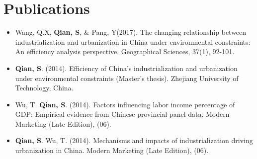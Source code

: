 \documentclass[letterpaper,11pt]{article}
\begin{document}
\section{Publications}
\begin{itemize}[leftmargin=*]
\item {Wang, Q.X, \textbf{Qian, S}, \& Pang, Y(2017). The changing relationship between industrialization and urbanization in China under environmental constraints: An efficiency analysis perspective. Geographical Sciences, 37(1), 92-101.}

\vspace{-5pt}
\item {\textbf{Qian, S}. (2014). Efficiency of China's industrialization and urbanization under environmental constraints (Master's thesis). Zhejiang University of Technology, China.}
\vspace{-5pt}
\item {Wu, T. \textbf{Qian, S}. (2014). Factors influencing labor income percentage of GDP: Empirical evidence from Chinese provincial panel data. Modern Marketing (Late Edition), (06).}
\vspace{-5pt}
\item {\textbf{Qian, S}. Wu, T. (2014). Mechanisms and impacts of industrialization driving urbanization in China. Modern Marketing (Late Edition), (06).}

\end{itemize}
\end{document}

